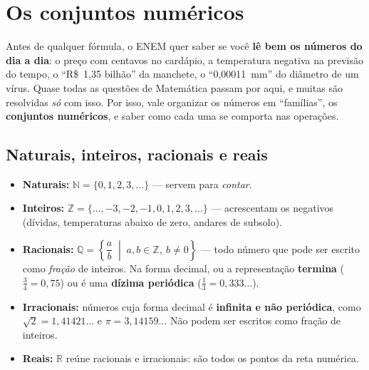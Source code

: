 
\section{Os conjuntos numéricos}

Antes de qualquer fórmula, o ENEM quer saber se você \textbf{lê bem os números do dia a dia}: o
preço com centavos no cardápio, a temperatura negativa na previsão do tempo, o ``R\$~1,35 bilhão''
da manchete, o ``0,00011~mm'' do diâmetro de um vírus. Quase todas as questões de Matemática passam
por aqui, e muitas são resolvidas \emph{só} com isso. Por isso, vale organizar os números em
``famílias'', os \textbf{conjuntos numéricos}, e saber como cada uma se comporta nas operações.

\subsection{Naturais, inteiros, racionais e reais}

\begin{definicao}
\begin{itemize}[leftmargin=1.4em,itemsep=2pt]
  \item \textbf{Naturais:} $\mathbb{N}=\{0,1,2,3,\dots\}$ --- servem para \emph{contar}.
  \item \textbf{Inteiros:} $\mathbb{Z}=\{\dots,-3,-2,-1,0,1,2,3,\dots\}$ --- acrescentam os negativos
        (dívidas, temperaturas abaixo de zero, andares de subsolo).
  \item \textbf{Racionais:} $\mathbb{Q}=\left\{\dfrac{a}{b}\;\middle|\;a,b\in\mathbb{Z},\ b\neq 0\right\}$ ---
        todo número que pode ser escrito como \emph{fração} de inteiros. Na forma decimal, ou a
        representação \textbf{termina} ($\frac{3}{4}=0,75$) ou é uma \textbf{dízima periódica}
        ($\frac{1}{3}=0,333\ldots$).
  \item \textbf{Irracionais:} números cuja forma decimal é \textbf{infinita e não periódica}, como
        $\sqrt{2}=1,41421\ldots$ e $\pi=3,14159\ldots$ Não podem ser escritos como fração de inteiros.
  \item \textbf{Reais:} $\mathbb{R}$ reúne racionais e irracionais: são todos os pontos da reta numérica.
\end{itemize}
\end{definicao}

